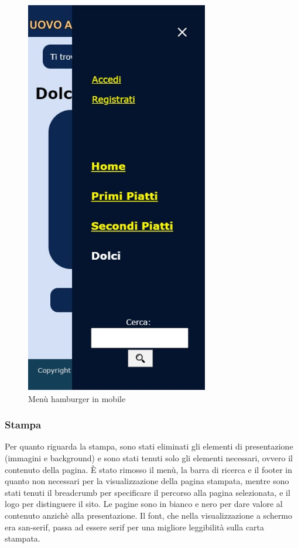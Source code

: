 \begin{figure}[H]
\begin{minipage}[b]{8.5cm}
		\centering
		\includegraphics[width=8cm]{img/progettazione/mobile-menu.jpg}
		\caption{Menù hamburger in mobile}
	\end{minipage}
\end{figure}


\subsubsection{Stampa}
\label{ssub:stampa}
Per quanto riguarda la stampa, sono stati eliminati gli elementi di presentazione (immagini e background) e sono stati tenuti solo gli elementi necessari, ovvero il contenuto della pagina. È stato rimosso il menù, la barra di ricerca e il footer in quanto non necessari per la visualizzazione della pagina stampata, mentre sono stati tenuti il breadcrumb per specificare il percorso alla pagina selezionata, e il logo per distinguere il sito.
Le pagine sono in bianco e nero per dare valore al contenuto anzichè alla presentazione. Il font, che nella visualizzazione a schermo era san-serif, passa ad essere serif per una migliore leggibilità sulla carta stampata.

